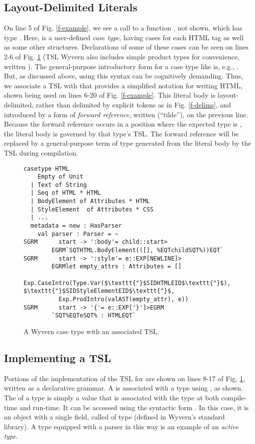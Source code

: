 \subsection{Layout-Delimited Literals}
On line 5 of Fig. \ref{f-example}, we see a call to a function , not shown, which has type . Here,  is a user-defined \emph{case type}, having cases for each HTML tag as well as some other structures. Declarations  of some of these cases can be seen on lines 2-6 of Fig. \ref{f-htmltype} (TSL Wyvern also includes simple product types for convenience, written ). The general-purpose introductory form for a case type like  is, e.g., . But, as discussed above, using this syntax can be cognitively demanding. Thus, we associate a TSL with  that provides a simplified notation for writing HTML, shown being used on lines 6-20 of Fig. \ref{f-example}. This literal body is layout-delimited, rather than delimited by explicit tokens as in Fig. \ref{f-delims}, and introduced by a form of \emph{forward reference}, written \li{~} (``tilde''), on the previous line. Because the forward reference occurs in a position where the expected type is , the literal body is governed by that type's TSL. The forward reference will be replaced by a general-purpose term of type  generated from the literal body by the TSL during compilation.
\begin{figure}[t]
\begin{lstlisting}[escapechar=$]
casetype HTML 
    Empty of Unit
  | Text of String
  | Seq of HTML * HTML 
  | BodyElement of Attributes * HTML
  | StyleElement  of Attributes * CSS
  | ...
  metadata = new : HasParser
    val parser : Parser = ~
SGRM      start -> ':body'= child::start>
        EGRM`SQTHTML.BodyElement(([], %EQTchildSQT%))EQT`
SGRM      start -> ':style'= e::EXP[NEWLINE]>
        EGRMlet empty_attrs : Attributes = []
        Exp.CaseIntro(Type.Var($\texttt{"}$SIDHTMLEID$\texttt{"}$), $\texttt{"}$SIDStyleElementEID$\texttt{"}$,
          Exp.ProdIntro(valAST(empty_attr), e))
SGRM      start -> '{'= e::EXP['}']>EGRM
        `SQT%EQTeSQT% : HTMLEQT`
\end{lstlisting}
\vspace{-8px}
\caption{A Wyvern case type with an associated TSL.}
\vspace{-10px}
\label{f-htmltype}
\end{figure}

\subsection{Implementing a TSL}
Portions of the implementation of the TSL for  are shown on lines 8-17 of Fig. \ref{f-htmltype}, written as a declarative grammar. A  is associated with a type using , as shown. The  of a type  is simply a value that is associated with the type at both compile-time and run-time. It can be accessed using the syntactic form . In this case, it is an object with a single field, called  of type  (defined in Wyvern's standard library). A type equipped with a parser in this way is an example of an \emph{active type}.

